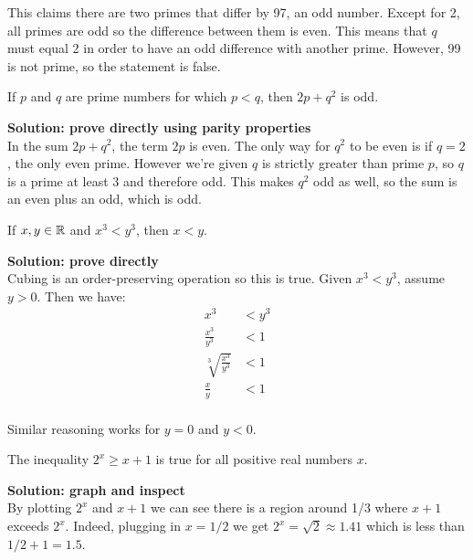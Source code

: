 \documentclass{article}
\begin{document}
This claims there are two primes that differ by 97, an odd number. Except for 2, all primes are odd so the difference between them is even. This means that $q$ must equal 2 in order to have an odd difference with another prime. However, 99 is not prime, so the statement is false.

\begin{problem}
If $p$ and $q$ are prime numbers for which $p < q$, then $2p + q^2$ is odd.
\end{problem}

\textbf{Solution: prove directly using parity properties}
\\

In the sum $2p + q^2$, the term $2p$ is even. The only way for $q^2$ to be even is if $q = 2$, the only even prime. However we're given $q$ is strictly greater than prime $p$, so $q$ is a prime at least 3 and therefore odd. This makes $q^2$ odd as well, so the sum is an even plus an odd, which is odd.

\begin{problem}
If $x, y \in \mathbb{R}$ and $x^3 < y^3$, then $x < y$.
\end{problem}

\textbf{Solution: prove directly}
\\

Cubing is an order-preserving operation so this is true. Given $x^3 < y^3$, assume $y > 0$. Then we have:
\begin{align*}
    x^3                       & < y^3 \\
    \frac{x^3}{y^3}           & < 1   \\
    \sqrt[3]{\frac{x^3}{y^3}} & < 1   \\
    \frac{x}{y}               & < 1   \\
\end{align*}

Similar reasoning works for $y = 0$ and $y < 0$.

\begin{problem}
The inequality $2^x \geq x + 1$ is true for all positive real numbers $x$.
\end{problem}

\textbf{Solution: graph and inspect}
\\

By plotting $2^x$ and $x + 1$ we can see there is a region around 1/3 where $x + 1$ exceeds $2^x$. Indeed, plugging in $x = 1/2$ we get $2^x = \sqrt{2} \approx 1.41$ which is less than $1/2 + 1 = 1.5$.
\end{document}
